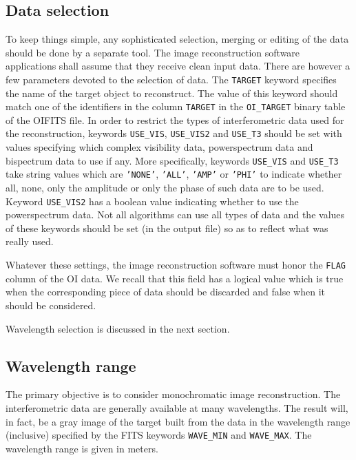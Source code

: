 \documentclass{article}
\newcommand{\KEYWORD}[1]{\texttt{#1}} %
\newcommand{\STRING}[1]{\texttt{'#1'}} %
\begin{document}
\subsection{Data selection}

To keep things simple, any sophisticated selection, merging or editing of
the data should be done by a separate tool.  The image reconstruction
software applications shall assume that they receive clean input data.
There are however a few parameters devoted to the selection of data.  The
\KEYWORD{TARGET} keyword specifies the name of the target object to
reconstruct.  The value of this keyword should match one of the identifiers
in the column \KEYWORD{TARGET} in the \texttt{OI\_TARGET} binary table of
the OIFITS file.  In order to restrict the types of interferometric data
used for the reconstruction, keywords \KEYWORD{USE\_VIS},
\KEYWORD{USE\_VIS2} and \KEYWORD{USE\_T3} should be set with values
specifying which complex visibility data, powerspectrum data and bispectrum
data to use if any.  More specifically, keywords \KEYWORD{USE\_VIS} and
\KEYWORD{USE\_T3} take string values which are \STRING{NONE}, \STRING{ALL},
\STRING{AMP} or \STRING{PHI} to indicate whether all, none, only the
amplitude or only the phase of such data are to be used.  Keyword
\KEYWORD{USE\_VIS2} has a boolean value indicating whether to use the
powerspectrum data.  Not all algorithms can use all types of data and the
values of these keywords should be set (in the output file) so as to
reflect what was really used.

Whatever these settings, the image reconstruction software must
honor the \KEYWORD{FLAG} column of the OI data.  We recall that this
field has a logical value which is true when the corresponding piece
of data should be discarded and false when it should be considered.

Wavelength selection is discussed in the next section.


\subsection{Wavelength range}

The primary objective is to consider monochromatic image reconstruction.
The interferometric data are generally available at many wavelengths.  The
result will, in fact, be a gray image of the target built from the data in
the wavelength range (inclusive) specified by the FITS keywords
\KEYWORD{WAVE\_MIN} and \KEYWORD{WAVE\_MAX}. The wavelength range is given
in meters.
\end{document}
